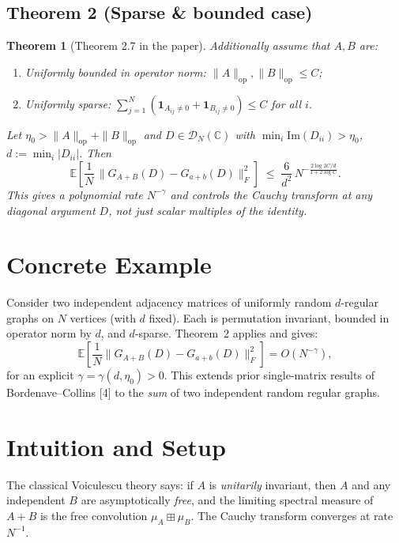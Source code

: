 \documentclass[11pt,a4paper]{article}
\newtheorem{theorem}{Theorem}
\begin{document}
\subsection*{Theorem 2 (Sparse \& bounded case)}

\begin{theorem}[Theorem 2.7 in the paper]
Additionally assume that $A,B$ are:
\begin{enumerate}
\item Uniformly bounded in operator norm: $\|A\|_{\mathrm{op}}, \|B\|_{\mathrm{op}} \le C$;
\item Uniformly sparse: $\sum_{j=1}^N (\mathbf{1}_{A_{ij}\neq 0} + \mathbf{1}_{B_{ij}\neq 0}) \le C$ for all $i$.
\end{enumerate}
Let $\eta_0 > \|A\|_{\mathrm{op}} + \|B\|_{\mathrm{op}}$ and $D\in\mathcal{D}_N(\mathbb{C})$ with $\min_i \mathrm{Im}(D_{ii}) > \eta_0$, $d:=\min_i |D_{ii}|$. Then
\[
  \mathbb{E}\left[\frac{1}{N}\,\bigl\|G_{A+B}(D) - G_{a+b}(D)\bigr\|_F^2\right]
  \;\le\; \frac{6}{d^2}\,N^{-\frac{2\log 2C/d}{1+2\log C}}.
\]
This gives a \emph{polynomial} rate $N^{-\gamma}$ and controls the Cauchy transform at any diagonal argument $D$, not just scalar multiples of the identity.
\end{theorem}

\section{Concrete Example}

Consider two independent adjacency matrices of uniformly random $d$-regular graphs on $N$ vertices (with $d$ fixed). Each is permutation invariant, bounded in operator norm by $d$, and $d$-sparse. Theorem~2 applies and gives:
\[
  \mathbb{E}\left[\frac{1}{N}\|G_{A+B}(D) - G_{a+b}(D)\|_F^2\right] = O\!\left(N^{-\gamma}\right),
\]
for an explicit $\gamma = \gamma(d,\eta_0)>0$. This extends prior single-matrix results of Bordenave--Collins [4] to the \emph{sum} of two independent random regular graphs.

\section{Intuition and Setup}

The classical Voiculescu theory says: if $A$ is \emph{unitarily} invariant, then $A$ and any independent $B$ are asymptotically \emph{free}, and the limiting spectral measure of $A+B$ is the free convolution $\mu_A\boxplus\mu_B$. The Cauchy transform converges at rate $N^{-1}$.
\end{document}
